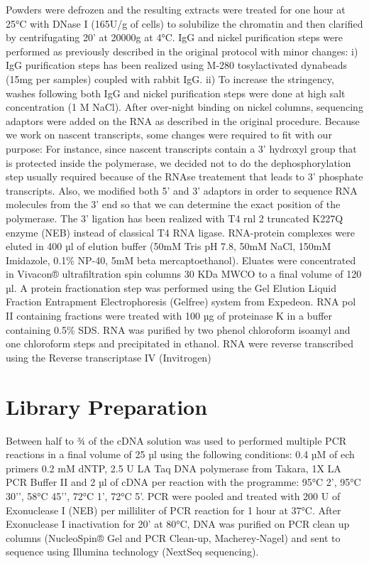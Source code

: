 Powders were defrozen and the resulting extracts were treated for one hour at 25°C with DNase I (165U/g of cells) to solubilize the chromatin and then clarified by centrifugating 20’ at 20000g at 4°C. 
IgG and nickel purification steps were performed as previously described in the original protocol \cite{granneman:2009:identification} with minor changes: i) IgG purification steps has been realized using M-280 tosylactivated dynabeads (15mg per samples) coupled with rabbit IgG. ii) To increase the stringency, washes following both IgG and nickel purification steps were done at high salt concentration (1 M NaCl). 
After over-night binding on nickel columns, sequencing adaptors were added on the RNA as described in the original procedure. Because we work on nascent transcripts, some changes were required to fit with our purpose: For instance, since nascent transcripts contain a 3’ hydroxyl group that is protected inside the polymerase, we decided not to do the dephosphorylation step usually required because of the RNAse treatement that leads to 3’ phosphate transcripts. Also, we modified both 5’ and 3’ adaptors  in order to sequence RNA molecules from the 3’ end so that we can determine the exact position of the polymerase. The 3’ ligation has been realized with T4 rnl 2 truncated K227Q enzyme (NEB) instead of classical T4 RNA ligase. 
RNA-protein complexes were eluted in 400 µl of elution buffer (50mM Tris pH 7.8, 50mM NaCl, 150mM Imidazole, 0.1\% NP-40, 5mM beta mercaptoethanol). Eluates were concentrated in Vivacon® ultrafiltration spin columns 30 KDa MWCO to a final volume of 120 µl. A protein fractionation step was performed using the Gel Elution Liquid Fraction Entrapment Electrophoresis (Gelfree) system from Expedeon. RNA pol II containing fractions were treated with 100 µg of proteinase K in a buffer containing 0.5\% SDS. RNA was purified by two phenol chloroform isoamyl and one chloroform steps and precipitated in ethanol. RNA were reverse transcribed using the Reverse transcriptase IV (Invitrogen)


\section*{Library Preparation}

Between half to ¾ of the cDNA solution was used to performed multiple PCR reactions in a final volume of 25 µl using the following conditions: 0.4 µM of ech primers 0.2 mM dNTP, 2.5 U LA Taq DNA polymerase from Takara, 1X LA PCR Buffer II and 2 µl of cDNA per reaction with the programme: 95°C 2’, 95°C 30’’, 58°C 45’’, 72°C 1’, 72°C 5’. 
PCR were pooled and treated with 200 U of Exonuclease I (NEB) per milliliter of PCR reaction for 1 hour at 37°C. After Exonuclease I inactivation for 20’ at 80°C, DNA was purified on PCR clean up columns (NucleoSpin® Gel and PCR Clean-up, Macherey-Nagel) and sent to sequence using Illumina technology (NextSeq sequencing). 

